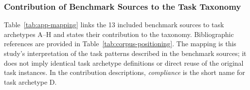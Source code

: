 \subsubsection{Contribution of Benchmark Sources to the Task Taxonomy}
\label{app:taxonomy/sources}

Table~\ref{tab:app-mapping} links the 13 included benchmark sources to task archetypes A--H and states their contribution to the taxonomy. Bibliographic references are provided in Table~\ref{tab:corpus-positioning}. The mapping is this study's interpretation of the task patterns described in the benchmark sources; it does not imply identical task archetype definitions or direct reuse of the original task instances. In the contribution descriptions, \emph{compliance} is the short name for task archetype D.

\begingroup
\renewcommand{\baselinestretch}{1}
\small
\setlength{\tabcolsep}{4pt}
\renewcommand{\arraystretch}{1.08}
